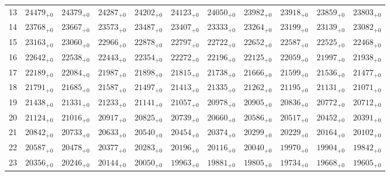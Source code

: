 \documentclass[10pt, a4paper]{article}
\begin{document}
\begin{center}
\begin{tabular}{c || c c c c c | c c c c c}
        13 & \({24479}_{+0}\) & \({24379}_{+0}\) & \({24287}_{+0}\) & \({24202}_{+0}\) & \({24123}_{+0}\) & \({24050}_{+0}\) & \({23982}_{+0}\) & \({23918}_{+0}\) & \({23859}_{+0}\) & \({23803}_{+0}\)\\
        14 & \({23768}_{+0}\) & \({23667}_{+0}\) & \({23573}_{+0}\) & \({23487}_{+0}\) & \({23407}_{+0}\) & \({23333}_{+0}\) & \({23264}_{+0}\) & \({23199}_{+0}\) & \({23139}_{+0}\) & \({23082}_{+0}\)\\
        15 & \({23163}_{+0}\) & \({23060}_{+0}\) & \({22966}_{+0}\) & \({22878}_{+0}\) & \({22797}_{+0}\) & \({22722}_{+0}\) & \({22652}_{+0}\) & \({22587}_{+0}\) & \({22525}_{+0}\) & \({22468}_{+0}\)\\
        \hline
        16 & \({22642}_{+0}\) & \({22538}_{+0}\) & \({22443}_{+0}\) & \({22354}_{+0}\) & \({22272}_{+0}\) & \({22196}_{+0}\) & \({22125}_{+0}\) & \({22059}_{+0}\) & \({21997}_{+0}\) & \({21938}_{+0}\)\\
        17 & \({22189}_{+0}\) & \({22084}_{+0}\) & \({21987}_{+0}\) & \({21898}_{+0}\) & \({21815}_{+0}\) & \({21738}_{+0}\) & \({21666}_{+0}\) & \({21599}_{+0}\) & \({21536}_{+0}\) & \({21477}_{+0}\)\\
        18 & \({21791}_{+0}\) & \({21685}_{+0}\) & \({21587}_{+0}\) & \({21497}_{+0}\) & \({21413}_{+0}\) & \({21335}_{+0}\) & \({21262}_{+0}\) & \({21195}_{+0}\) & \({21131}_{+0}\) & \({21071}_{+0}\)\\
        19 & \({21438}_{+0}\) & \({21331}_{+0}\) & \({21233}_{+0}\) & \({21141}_{+0}\) & \({21057}_{+0}\) & \({20978}_{+0}\) & \({20905}_{+0}\) & \({20836}_{+0}\) & \({20772}_{+0}\) & \({20712}_{+0}\)\\
        20 & \({21124}_{+0}\) & \({21016}_{+0}\) & \({20917}_{+0}\) & \({20825}_{+0}\) & \({20739}_{+0}\) & \({20660}_{+0}\) & \({20586}_{+0}\) & \({20517}_{+0}\) & \({20452}_{+0}\) & \({20391}_{+0}\)\\
        \hline
        21 & \({20842}_{+0}\) & \({20733}_{+0}\) & \({20633}_{+0}\) & \({20540}_{+0}\) & \({20454}_{+0}\) & \({20374}_{+0}\) & \({20299}_{+0}\) & \({20229}_{+0}\) & \({20164}_{+0}\) & \({20102}_{+0}\)\\
        22 & \({20587}_{+0}\) & \({20478}_{+0}\) & \({20377}_{+0}\) & \({20283}_{+0}\) & \({20196}_{+0}\) & \({20116}_{+0}\) & \({20040}_{+0}\) & \({19970}_{+0}\) & \({19904}_{+0}\) & \({19842}_{+0}\)\\
        23 & \({20356}_{+0}\) & \({20246}_{+0}\) & \({20144}_{+0}\) & \({20050}_{+0}\) & \({19963}_{+0}\) & \({19881}_{+0}\) & \({19805}_{+0}\) & \({19734}_{+0}\) & \({19668}_{+0}\) & \({19605}_{+0}\)\\

\end{tabular}
\end{center}
\end{document}
